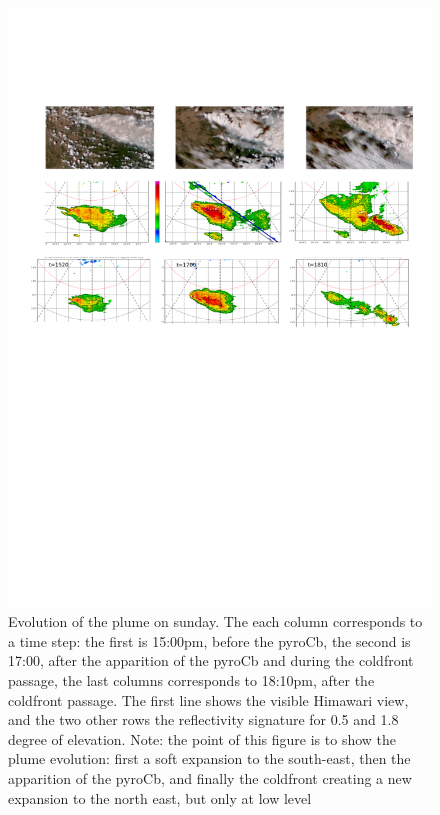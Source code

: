 \documentclass[12pt]{article}
\begin{document}
\begin{figure}[position]
   \caption{\label{3steps} Evolution of the plume on sunday. The each column corresponds to a time step: the first is 15:00pm, before the pyroCb, the second is 17:00, after the apparition of the pyroCb and during the coldfront passage, the last columns corresponds to 18:10pm, after the coldfront passage. The first line shows the visible Himawari view, and the two other rows the reflectivity signature for 0.5 and 1.8 degree of elevation.   {\color{red} Note: the point of this figure is to show the plume evolution: first a soft expansion to the south-east, then the apparition of the pyroCb, and finally the coldfront creating a new expansion to the north east, but only at low level} }
   \includegraphics[width=\textwidth]{figures/3main_steps.png}
\end{figure}
\end{document}
